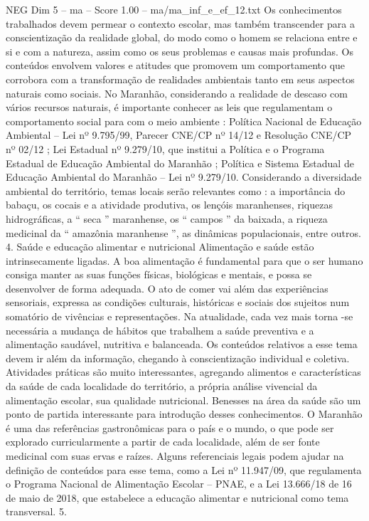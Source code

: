 \begin{textsample}{NEG Dim 5 – ma – Score 1.00 – ma/ma\_inf\_e\_ef\_12.txt}
Os conhecimentos trabalhados devem permear o contexto escolar, mas também transcender para a conscientização da realidade global, do modo como o homem se relaciona entre e si e com a natureza, assim como os seus problemas e causas mais profundas.
Os conteúdos envolvem valores e atitudes que promovem um comportamento que corrobora com a transformação de realidades ambientais tanto em seus aspectos naturais como sociais.
No Maranhão, considerando a realidade de descaso com vários recursos naturais, é importante conhecer as leis que regulamentam o comportamento social para com o meio ambiente : Política Nacional de Educação Ambiental – Lei nº 9.795/99, Parecer CNE/CP nº 14/12 e Resolução CNE/CP nº 02/12 ; Lei Estadual nº 9.279/10, que institui a Política e o Programa Estadual de Educação Ambiental do Maranhão ; Política e Sistema Estadual de Educação Ambiental do Maranhão – Lei nº 9.279/10.
Considerando a diversidade ambiental do território, temas locais serão relevantes como : a importância do babaçu, os cocais e a atividade produtiva, os lençóis maranhenses, riquezas hidrográficas, a “ seca ” maranhense, os “ campos ” da baixada, a riqueza medicinal da “ amazônia maranhense ”, as dinâmicas populacionais, entre outros. 4.
Saúde e educação alimentar e nutricional Alimentação e saúde estão intrinsecamente ligadas.
A boa alimentação é fundamental para que o ser humano consiga manter as suas funções físicas, biológicas e mentais, e possa se desenvolver de forma adequada.
O ato de comer vai além das experiências sensoriais, expressa as condições culturais, históricas e sociais dos sujeitos num somatório de vivências e representações.
Na atualidade, cada vez mais torna -se necessária a mudança de hábitos que trabalhem a saúde preventiva e a alimentação saudável, nutritiva e balanceada.
Os conteúdos relativos a esse tema devem ir além da informação, chegando à conscientização individual e coletiva.
Atividades práticas são muito interessantes, agregando alimentos e características da saúde de cada localidade do território, a própria análise vivencial da alimentação escolar, sua qualidade nutricional.
Benesses na área da saúde são um ponto de partida interessante para introdução desses conhecimentos.
O Maranhão é uma das referências gastronômicas para o país e o mundo, o que pode ser explorado curricularmente a partir de cada localidade, além de ser fonte medicinal com suas ervas e raízes.
Alguns referenciais legais podem ajudar na definição de conteúdos para esse tema, como a Lei nº 11.947/09, que regulamenta o Programa Nacional de Alimentação Escolar – PNAE, e a Lei 13.666/18 de 16 de maio de 2018, que estabelece a educação alimentar e nutricional como tema transversal. 5.

\end{textsample}
